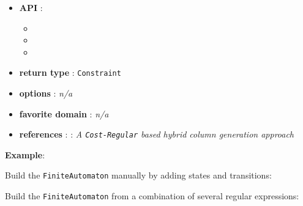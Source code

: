 \begin{itemize}
	\item \textbf{API} :
	\begin{itemize}
		\item {}
		\item {}
		\item {}
	\end{itemize}
	\item \textbf{return type} : \texttt{Constraint}
	\item \textbf{options} : \emph{n/a}
	\item \textbf{favorite domain} : \emph{n/a}
	\item \textbf{references} : \cite{DemasseyC06}: \emph{A \texttt{Cost-Regular} based hybrid column generation approach}
\end{itemize}



\textbf{Example}:

Build the \texttt{FiniteAutomaton} manually by adding states and transitions:


Build the \texttt{FiniteAutomaton} from a combination of several regular expressions: 

